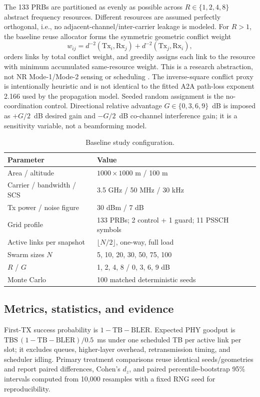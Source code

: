 The 133 PRBs are partitioned as evenly as possible across $R\in\{1,2,4,8\}$ abstract frequency resources. Different resources are assumed perfectly orthogonal, i.e., no adjacent-channel/inter-carrier leakage is modeled. For $R>1$, the baseline reuse allocator forms the symmetric geometric conflict weight
\begin{equation}
 w_{ij}=d^{-2}(\mathrm{Tx}_i,\mathrm{Rx}_j)+d^{-2}(\mathrm{Tx}_j,\mathrm{Rx}_i),
\end{equation}
orders links by total conflict weight, and greedily assigns each link to the resource with minimum accumulated same-resource weight. This is a research abstraction, not NR Mode-1/Mode-2 sensing or scheduling \cite{garcia2021nrv2x}. The inverse-square conflict proxy is intentionally heuristic and is not identical to the fitted A2A path-loss exponent 2.166 used by the propagation model. Seeded random assignment is the no-coordination control. Directional relative advantage $G\in\{0,3,6,9\}$~dB is imposed as $+G/2$~dB desired gain and $-G/2$~dB co-channel interference gain; it is a sensitivity variable, not a beamforming model.

\begin{table}[t]
\caption{Baseline study configuration.}
\label{tab:setup}
\centering
\scriptsize
\begin{tabular}{@{}p{}p{}@{}}
\toprule
Parameter & Value \\
\midrule
Area / altitude & $1000\times1000$ m / 100 m \\
Carrier / bandwidth / SCS & 3.5 GHz / 50 MHz / 30 kHz \\
Tx power / noise figure & 30 dBm / 7 dB \\
Grid profile & 133 PRBs; 2 control + 1 guard; 11 PSSCH symbols \\
Active links per snapshot & $\lfloor N/2\rfloor$, one-way, full load \\
Swarm sizes $N$ & 5, 10, 20, 30, 50, 75, 100 \\
$R$ / $G$ & 1, 2, 4, 8 / 0, 3, 6, 9 dB \\
Monte Carlo & 100 matched deterministic seeds \\
\bottomrule
\end{tabular}
\end{table}

\subsection{Metrics, statistics, and evidence}
First-TX success probability is $1-\mathrm{TB\!\!\!-BLER}$. Expected PHY goodput is $\mathrm{TBS}\,(1-\mathrm{TB\!\!\!-BLER})/0.5$~ms under one scheduled TB per active link per slot; it excludes queues, higher-layer overhead, retransmission timing, and scheduler idling. Primary treatment comparisons reuse identical seeds/geometries and report paired differences, Cohen's $d_z$, and paired percentile-bootstrap 95\% intervals computed from 10,000 resamples with a fixed RNG seed for reproducibility.

